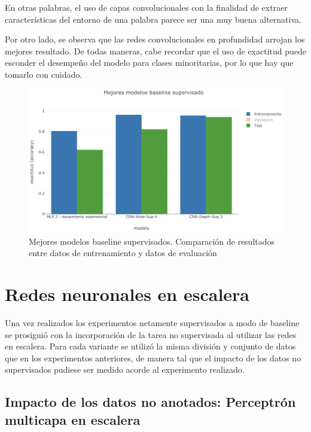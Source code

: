 En otras palabras, el uso de capas convolucionales con la finalidad de extraer características del entorno de 
una palabra parece ser una muy buena alternativa.

Por otro lado, se observa que las redes convolucionales en profundidad arrojan los mejores resultado. De todas
maneras, cabe recordar que el uso de exactitud puede esconder el desempeño del modelo para clases 
minoritarias, por lo que hay que tomarlo con cuidado.

\begin{figure}[t]
\begin{center}
\includegraphics[width=.9\linewidth]{images/best_supervised_baselines.png}
\caption{Mejores modelos baseline supervisados. Comparación de resultados entre datos de entrenamiento y
datos de evaluación}
\label{fig:best_supervised_baselines}
\end{center}
\end{figure}

\section{Redes neuronales en escalera}

Una vez realizados los experimentos netamente supervisados a modo de baseline se prosiguió con la 
incorporación de la tarea no supervisada al utilizar las redes en escalera. Para cada variante se utilizó la 
misma división y conjunto de datos que en los experimentos anteriores, de manera tal que el impacto de los
datos no supervisados pudiese ser medido acorde al experimento realizado.

\subsection{Impacto de los datos no anotados: Perceptrón multicapa en escalera}

